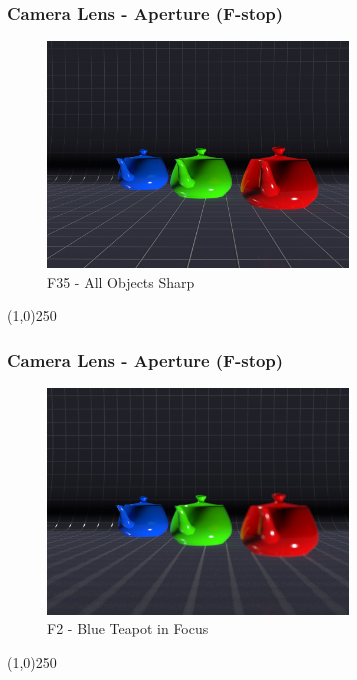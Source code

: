 \begin{frame}
\frametitle{Camera Lens - Aperture (F-stop)}
\begin{figure}
	\centering
	\includegraphics[height=6cm]{img/Camras/F35Teapots.jpg}
	\caption[F35 - All Objects Sharp]{F35 - All Objects Sharp}
	\label{fig:200mm}
\end{figure}
\end{frame}
\begin{center}\line(1,0){250}\end{center}



\begin{frame}
\frametitle{Camera Lens - Aperture (F-stop)}
\begin{figure}
	\centering
	\includegraphics[height=6cm]{img/Camras/BlueTeapot.jpg}
	\caption[F2 - Blue Teapot in Focus]{F2 - Blue Teapot in Focus}
	\label{fig:BlueTeaPot}
\end{figure}
\end{frame}
\begin{center}\line(1,0){250}\end{center}



